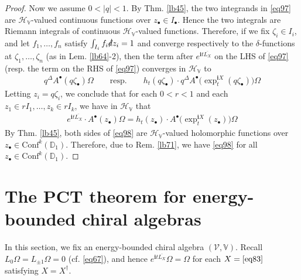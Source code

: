 \documentclass[12pt,b5paper,notitlepage]{article}
\theoremstyle{definition}
\theoremstyle{plain}
\newcommand{\mc}{\mathcal}
\newcommand{\ovl}{\overline}
\newcommand{\Conf}{\mathrm{Conf}}
\newcommand{\im}{\mathbf{i}}
\newcommand{\blt}{\bullet}
\newcommand{\Vbb}{\mathbb V}
\newcommand{\Dbb}{\mathbb D}
\newcommand{\HV}{\mathcal H_{\mathbb V}}
\newcommand{\sd}{\slashed{d}}
\numberwithin{equation}{section}
\begin{document}
\begin{proof}
Now we assume $0<|q|<1$. By Thm. \ref{lb45}, the two integrands in \eqref{eq97} are $\HV$-valued continuous functions over $z_\blt\in I_\blt$. Hence the two integrals are Riemann integrals of continuous $\HV$-valued functions. Therefore, if we fix $\zeta_i\in I_i$, and let $f_1,\dots,f_n$ satisfy $\int_{I_i}f_i\sd z_i=1$ and converge respectively to the $\delta$-functions at $\zeta_1,\dots,\zeta_n$ (as in Lem. \ref{lb64}-2), then the term after $e^{\im t\ovl{L_X}}$ on the LHS of \eqref{eq97} (resp. the term on the RHS of \eqref{eq97}) converges in $\HV$ to
\begin{align*}
q^\Delta A^\blt(q\zeta_\blt)\Omega\qquad\text{resp.}\qquad h_t(q\zeta_\blt)\cdot  q^\Delta A^\blt\big(\exp_t^{\im X}(q\zeta_\blt)\big)\Omega
\end{align*}
Letting $z_i=q\zeta_i$, we conclude that for each $0<r<1$ and each $z_1\in rI_1,\dots,z_k\in rI_k$, we have in $\HV$ that
\begin{align}\label{eq98}
e^{\im t\ovl{L_X}} \cdot A^\blt(z_\blt)\Omega=h_t(z_\blt)\cdot   A^\blt\big(\exp_t^{\im X}(z_\blt)\big)\Omega
\end{align} 
By Thm. \ref{lb45}, both sides of \eqref{eq98} are $\HV$-valued holomorphic functions over $z_\blt\in\Conf^k(\Dbb_1)$. Therefore, due to Rem. \ref{lb71}, we have \eqref{eq98} for all $z_\blt\in\Conf^k(\Dbb_1)$.
\end{proof}



\newpage



\section{The PCT theorem for energy-bounded chiral algebras}



In this section, we fix an energy-bounded chiral algebra $(\mc V,\Vbb)$. Recall $L_0\Omega=L_{\pm 1}\Omega=0$ (cf. \eqref{eq67}), and hence $e^{\im t\ovl{L_X}}\Omega=\Omega$ for each $X=\eqref{eq83}$ satisfying $X=X^\dagger$.



















 
\hypertarget{beforeindex}{}	
\end{document}
